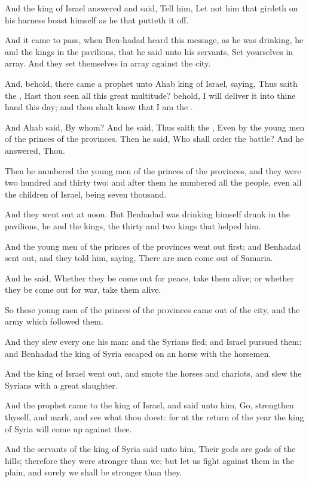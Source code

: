 \verse And the king of Israel answered and said, Tell him, Let not him that girdeth on his harness boast himself as he that putteth it off.

\verse And it came to pass, when Ben-hadad heard this message, as he was drinking, he and the kings in the pavilions, that he said unto his servants, Set yourselves in array. And they set themselves in array against the city.

\verse And, behold, there came a prophet unto Ahab king of Israel, saying, Thus saith the \LORD, Hast thou seen all this great multitude?  behold, I will deliver it into thine hand this day; and thou shalt know that I am the \LORD.

\verse And Ahab said, By whom? And he said, Thus saith the \LORD, Even by the young men of the princes of the provinces. Then he said, Who shall order the battle? And he answered, Thou.

\verse Then he numbered the young men of the princes of the provinces, and they were two hundred and thirty two: and after them he numbered all the people, even all the children of Israel, being seven thousand.

\verse And they went out at noon. But Benhadad was drinking himself drunk in the pavilions, he and the kings, the thirty and two kings that helped him.

\verse And the young men of the princes of the provinces went out first; and Benhadad sent out, and they told him, saying, There are men come out of Samaria.

\verse And he said, Whether they be come out for peace, take them alive; or whether they be come out for war, take them alive.

\verse So these young men of the princes of the provinces came out of the city, and the army which followed them.

\verse And they slew every one his man: and the Syrians fled; and Israel pursued them: and Benhadad the king of Syria escaped on an horse with the horsemen.

\verse And the king of Israel went out, and smote the horses and chariots, and slew the Syrians with a great slaughter.

\verse And the prophet came to the king of Israel, and said unto him, Go, strengthen thyself, and mark, and see what thou doest: for at the return of the year the king of Syria will come up against thee.

\verse And the servants of the king of Syria said unto him, Their gods are gods of the hills; therefore they were stronger than we; but let us fight against them in the plain, and surely we shall be stronger than they.

